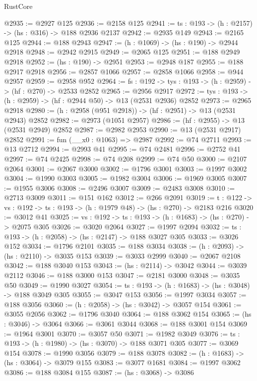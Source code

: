 \begin{lexlean}{RustCore}
\begin{coremodule}
@2935 := @2927 @125
@2936 := @2158 @125
@2941 := {ts : @193} -> (h : @2157) -> (hs : @316) -> @188 @2936 @2137
@2942 := @2935 @149
@2943 := @2165 @125
@2944 := @188 @2943
@2947 := (h : @1069) -> (hs : @190) -> @2944 @2918
@2948 := @2942 @2915
@2949 := @2065 @125
@2951 := @188 @2949 @2918
@2952 := (hs : @190) -> @2951
@2953 := @2948 @187
@2955 := @188 @2917 @2918
@2956 := @2857 @1066
@2957 := @2858 @1066
@2958 := @944 @2957
@2959 := @2958 @952
@2964 := {fs : @192} -> {tys : @193} -> (h : @2959) -> (hf : @270) -> @2533 @2852
@2965 := @2956 @2917
@2972 := {tys : @193} -> (h : @2959) -> (hf : @2944 @50) -> @13 (@2531 @2936) @2852
@2973 := @2965 @2918
@2980 := (h : @2958 (@951 @2918)) -> (hf : @2951) -> @13 (@2531 @2943) @2852
@2982 := @2973 (@1051 @2957)
@2986 := (hf : @2955) -> @13 (@2531 @2949) @2852
@2987 := @2982 @2953
@2990 := @13 (@2531 @2917) @2852
@2991 := fun (__x0 : @1063) => @2987
@2992 := @74 @2711
@2993 := @13 @2712
@2994 := @2993 @41
@2995 := @74 @2481
@2996 := @2752 @41
@2997 := @74 @2425
@2998 := @74 @208
@2999 := @74 @50
@3000 := @2107 @2064
@3001 := @2067 @3000
@3002 := @1796 @3001
@3003 := @1997 @3002
@3004 := @1990 @3003
@3005 := @1982 @3004
@3006 := @1969 @3005
@3007 := @1955 @3006
@3008 := @2496 @3007
@3009 := @2483 @3008
@3010 := @2713 @3009
@3011 := @151 @162
@3012 := @266 @2091
@3019 := {t : @122} -> {vs : @192} -> {ts : @193} -> (h : @1979 @48) -> (hs : @270) -> @2183 @216
@3020 := @3012 @41
@3025 := {vs : @192} -> {ts : @193} -> (h : @1683) -> (hs : @270) -> @2075 @305
@3026 := @3020 @2064
@3027 := @1997 @2094
@3032 := {ts : @193} -> (h : @2058) -> (hs : @2147) -> @188 @3027 @305
@3033 := @3026 @152
@3034 := @1796 @2101
@3035 := @188 @3034
@3038 := (h : @2093) -> (hs : @2110) -> @3035 @153
@3039 := @3033 @2999
@3040 := @2067 @2108
@3042 := @188 @3040 @153
@3043 := (hs : @2114) -> @3042
@3044 := @3039 @2112
@3046 := @188 @3000 @153
@3047 := @2181 @3000
@3048 := @3035 @50
@3049 := @1990 @3027
@3054 := {ts : @193} -> (h : @1683) -> (hs : @3048) -> @188 @3049 @305
@3055 := @3047 @153
@3056 := @1997 @3034
@3057 := @188 @3056
@3060 := (h : @2058) -> (hs : @3042) -> @3057 @154
@3061 := @3055 @2056
@3062 := @1796 @3040
@3064 := @188 @3062 @154
@3065 := (hs : @3046) -> @3064
@3066 := @3061 @3044
@3068 := @188 @3001 @154
@3069 := @1964 @3001
@3070 := @3057 @50
@3071 := @1982 @3049
@3076 := {ts : @193} -> (h : @1980) -> (hs : @3070) -> @188 @3071 @305
@3077 := @3069 @154
@3078 := @1990 @3056
@3079 := @188 @3078
@3082 := (h : @1683) -> (hs : @3064) -> @3079 @155
@3083 := @3077 @1681
@3084 := @1997 @3062
@3086 := @188 @3084 @155
@3087 := (hs : @3068) -> @3086

\end{coremodule}
\end{lexlean}
